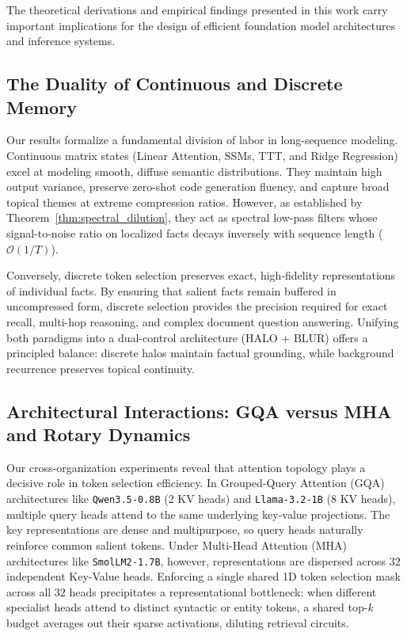 \documentclass[11pt,a4paper]{article}
\begin{document}
The theoretical derivations and empirical findings presented in this work carry important implications for the design of efficient foundation model architectures and inference systems.

\subsection{The Duality of Continuous and Discrete Memory}
Our results formalize a fundamental division of labor in long-sequence modeling. Continuous matrix states (Linear Attention, SSMs, TTT, and Ridge Regression) excel at modeling smooth, diffuse semantic distributions. They maintain high output variance, preserve zero-shot code generation fluency, and capture broad topical themes at extreme compression ratios. However, as established by Theorem~\ref{thm:spectral_dilution}, they act as spectral low-pass filters whose signal-to-noise ratio on localized facts decays inversely with sequence length ($\mathcal{O}(1/T)$).

Conversely, discrete token selection preserves exact, high-fidelity representations of individual facts. By ensuring that salient facts remain buffered in uncompressed form, discrete selection provides the precision required for exact recall, multi-hop reasoning, and complex document question answering. Unifying both paradigms into a dual-control architecture (HALO + BLUR) offers a principled balance: discrete halos maintain factual grounding, while background recurrence preserves topical continuity.

\subsection{Architectural Interactions: GQA versus MHA and Rotary Dynamics}
Our cross-organization experiments reveal that attention topology plays a decisive role in token selection efficiency. In Grouped-Query Attention (GQA) architectures like \texttt{Qwen3.5-0.8B} (2 KV heads) and \texttt{Llama-3.2-1B} (8 KV heads), multiple query heads attend to the same underlying key-value projections. The key representations are dense and multipurpose, so query heads naturally reinforce common salient tokens. Under Multi-Head Attention (MHA) architectures like \texttt{SmolLM2-1.7B}, however, representations are dispersed across 32 independent Key-Value heads. Enforcing a single shared 1D token selection mask across all 32 heads precipitates a representational bottleneck: when different specialist heads attend to distinct syntactic or entity tokens, a shared top-$k$ budget averages out their sparse activations, diluting retrieval circuits.
\end{document}
